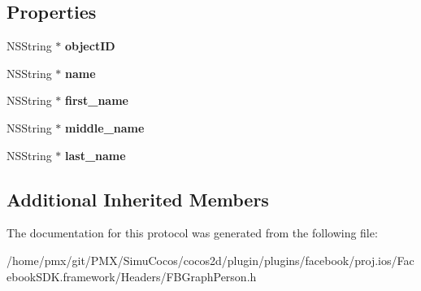 \subsection*{Properties}
\begin{DoxyCompactItemize}
\item 
\mbox{\label{protocolFBGraphPerson-p_ab8f1efc27011140ed26fcaca0dbfce23}} 
N\+S\+String $\ast$ {\bfseries object\+ID}
\item 
\mbox{\label{protocolFBGraphPerson-p_a517fb548dda8ccfe9fc0b9999e398179}} 
N\+S\+String $\ast$ {\bfseries name}
\item 
\mbox{\label{protocolFBGraphPerson-p_ad88d971caf25d6d98b2954083bf1dc3b}} 
N\+S\+String $\ast$ {\bfseries first\+\_\+name}
\item 
\mbox{\label{protocolFBGraphPerson-p_add68fc4602afd9bb3494604741393479}} 
N\+S\+String $\ast$ {\bfseries middle\+\_\+name}
\item 
\mbox{\label{protocolFBGraphPerson-p_a9c2376d889ef41b725f92eef9307db77}} 
N\+S\+String $\ast$ {\bfseries last\+\_\+name}
\end{DoxyCompactItemize}
\subsection*{Additional Inherited Members}


The documentation for this protocol was generated from the following file\+:\begin{DoxyCompactItemize}
\item 
/home/pmx/git/\+P\+M\+X/\+Simu\+Cocos/cocos2d/plugin/plugins/facebook/proj.\+ios/\+Facebook\+S\+D\+K.\+framework/\+Headers/F\+B\+Graph\+Person.\+h\end{DoxyCompactItemize}
